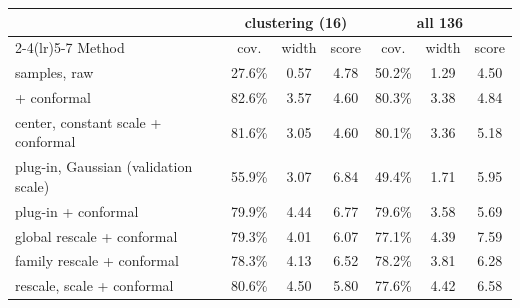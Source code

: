 \begin{tabular}{@{}p{2.55in}cccccc@{}}
\toprule
 & \multicolumn{3}{c}{clustering (16)} & \multicolumn{3}{c}{all 136} \\
\cmidrule(lr){2-4}\cmidrule(lr){5-7}
Method & cov. & width & score & cov. & width & score \\
\midrule
\method{} samples, raw & 27.6\% & 0.57 & 4.78 & 50.2\% & 1.29 & 4.50 \\
\method{} + conformal & 82.6\% & 3.57 & 4.60 & 80.3\% & 3.38 & 4.84 \\
\method{} center, constant scale + conformal & 81.6\% & 3.05 & 4.60 & 80.1\% & 3.36 & 5.18 \\
plug-in, Gaussian (validation scale) & 55.9\% & 3.07 & 6.84 & 49.4\% & 1.71 & 5.95 \\
plug-in + conformal & 79.9\% & 4.44 & 6.77 & 79.6\% & 3.58 & 5.69 \\
global rescale + conformal & 79.3\% & 4.01 & 6.07 & 77.1\% & 4.39 & 7.59 \\
family rescale + conformal & 78.3\% & 4.13 & 6.52 & 78.2\% & 3.81 & 6.28 \\
rescale, \method{} scale + conformal & 80.6\% & 4.50 & 5.80 & 77.6\% & 4.42 & 6.58 \\
\bottomrule
\end{tabular}
